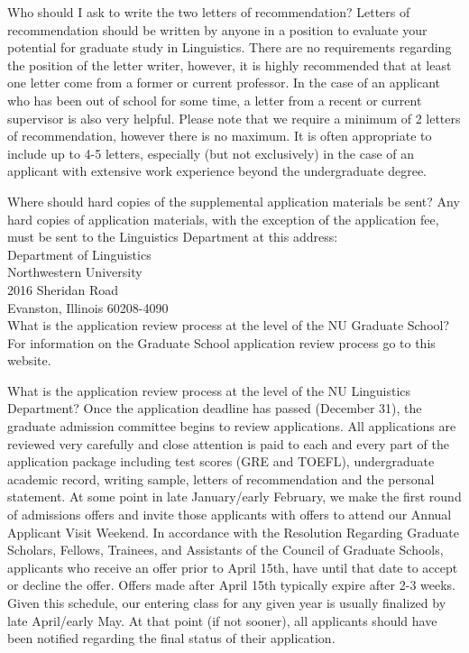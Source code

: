 \documentclass[11pt]{article}
\begin{document}
Who should I ask to write the two letters of recommendation?
Letters of recommendation should be written by anyone in a position to evaluate your potential for graduate study in Linguistics. There are no requirements regarding the position of the letter writer, however, it is highly recommended that at least one letter come from a former or current professor. In the case of an applicant who has been out of school for some time, a letter from a recent or current supervisor is also very helpful. Please note that we require a minimum of 2 letters of recommendation, however there is no maximum. It is often appropriate to include up to 4-5 letters, especially (but not exclusively) in the case of an applicant with extensive work experience beyond the undergraduate degree.

Where should hard copies of the supplemental application materials be sent?
Any hard copies of application materials, with the exception of the application fee, must be sent to the Linguistics Department at this address:\\

Department of Linguistics \\
Northwestern University \\
2016 Sheridan Road \\
Evanston, Illinois 60208-4090\\

What is the application review process at the level of the NU Graduate School?
For information on the Graduate School application review process go to this website.

What is the application review process at the level of the NU Linguistics Department?
Once the application deadline has passed (December 31), the graduate admission committee begins to review applications. All applications are reviewed very carefully and close attention is paid to each and every part of the application package including test scores (GRE and TOEFL), undergraduate academic record, writing sample, letters of recommendation and the personal statement. At some point in late January/early February, we make the first round of admissions offers and invite those applicants with offers to attend our Annual Applicant Visit Weekend. In accordance with the Resolution Regarding Graduate Scholars, Fellows, Trainees, and Assistants of the Council of Graduate Schools, applicants who receive an offer prior to April 15th, have until that date to accept or decline the offer. Offers made after April 15th typically expire after 2-3 weeks. Given this schedule, our entering class for any given year is usually finalized by late April/early May. At that point (if not sooner), all applicants should have been notified regarding the final status of their application.
\end{document}
